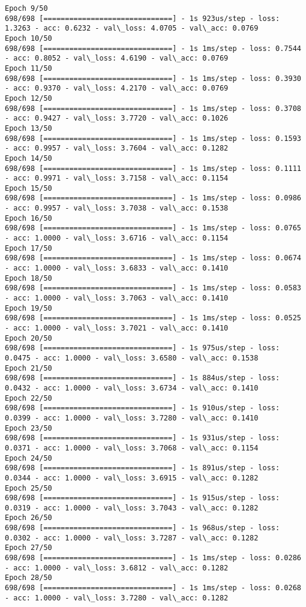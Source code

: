 \documentclass[11pt]{article}
\begin{document}
\begin{Verbatim}[commandchars=\\\{\}]
Epoch 9/50
698/698 [==============================] - 1s 923us/step - loss: 1.3263 - acc: 0.6232 - val\_loss: 4.0705 - val\_acc: 0.0769
Epoch 10/50
698/698 [==============================] - 1s 1ms/step - loss: 0.7544 - acc: 0.8052 - val\_loss: 4.6190 - val\_acc: 0.0769
Epoch 11/50
698/698 [==============================] - 1s 1ms/step - loss: 0.3930 - acc: 0.9370 - val\_loss: 4.2170 - val\_acc: 0.0769
Epoch 12/50
698/698 [==============================] - 1s 1ms/step - loss: 0.3708 - acc: 0.9427 - val\_loss: 3.7720 - val\_acc: 0.1026
Epoch 13/50
698/698 [==============================] - 1s 1ms/step - loss: 0.1593 - acc: 0.9957 - val\_loss: 3.7604 - val\_acc: 0.1282
Epoch 14/50
698/698 [==============================] - 1s 1ms/step - loss: 0.1111 - acc: 0.9971 - val\_loss: 3.7158 - val\_acc: 0.1154
Epoch 15/50
698/698 [==============================] - 1s 1ms/step - loss: 0.0986 - acc: 0.9957 - val\_loss: 3.7038 - val\_acc: 0.1538
Epoch 16/50
698/698 [==============================] - 1s 1ms/step - loss: 0.0765 - acc: 1.0000 - val\_loss: 3.6716 - val\_acc: 0.1154
Epoch 17/50
698/698 [==============================] - 1s 1ms/step - loss: 0.0674 - acc: 1.0000 - val\_loss: 3.6833 - val\_acc: 0.1410
Epoch 18/50
698/698 [==============================] - 1s 1ms/step - loss: 0.0583 - acc: 1.0000 - val\_loss: 3.7063 - val\_acc: 0.1410
Epoch 19/50
698/698 [==============================] - 1s 1ms/step - loss: 0.0525 - acc: 1.0000 - val\_loss: 3.7021 - val\_acc: 0.1410
Epoch 20/50
698/698 [==============================] - 1s 975us/step - loss: 0.0475 - acc: 1.0000 - val\_loss: 3.6580 - val\_acc: 0.1538
Epoch 21/50
698/698 [==============================] - 1s 884us/step - loss: 0.0432 - acc: 1.0000 - val\_loss: 3.6734 - val\_acc: 0.1410
Epoch 22/50
698/698 [==============================] - 1s 910us/step - loss: 0.0399 - acc: 1.0000 - val\_loss: 3.7280 - val\_acc: 0.1410
Epoch 23/50
698/698 [==============================] - 1s 931us/step - loss: 0.0371 - acc: 1.0000 - val\_loss: 3.7068 - val\_acc: 0.1154
Epoch 24/50
698/698 [==============================] - 1s 891us/step - loss: 0.0344 - acc: 1.0000 - val\_loss: 3.6915 - val\_acc: 0.1282
Epoch 25/50
698/698 [==============================] - 1s 915us/step - loss: 0.0319 - acc: 1.0000 - val\_loss: 3.7043 - val\_acc: 0.1282
Epoch 26/50
698/698 [==============================] - 1s 968us/step - loss: 0.0302 - acc: 1.0000 - val\_loss: 3.7287 - val\_acc: 0.1282
Epoch 27/50
698/698 [==============================] - 1s 1ms/step - loss: 0.0286 - acc: 1.0000 - val\_loss: 3.6812 - val\_acc: 0.1282
Epoch 28/50
698/698 [==============================] - 1s 1ms/step - loss: 0.0268 - acc: 1.0000 - val\_loss: 3.7280 - val\_acc: 0.1282

\end{Verbatim}
\end{document}
